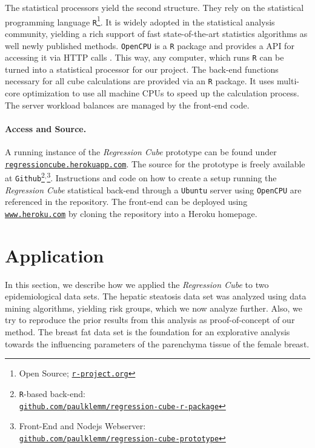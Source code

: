 \documentclass[journal]{style/vgtc} 			          %
\newcommand{\com}[1]{\textcolor{orange}{\uline{#1}}}
\begin{document}
The statistical processors yield the second structure.
They rely on the statistical programming language \texttt{R}\footnote{Open Source; \href{http://r-project.org}{\texttt{r-project.org}}}.
It is widely adopted in the statistical analysis community, yielding a rich support of fast state-of-the-art statistics algorithms as well newly published methods.
\texttt{OpenCPU} is a \texttt{R} package and provides a API for accessing it via HTTP calls \cite{Ooms}.
This way, any computer, which runs \texttt{R} can be turned into a statistical processor for our project.
The back-end functions necessary for all cube calculations are provided via an \texttt{R} package.
It uses multi-core optimization to use all machine CPUs to speed up the calculation process.
The server workload balances are managed by the front-end code.

\paragraph{Access and Source.}
A running instance of the \emph{Regression Cube} prototype can be found under \href{http://regressioncube.herokuapp.com/}{\texttt{regressioncube.herokuapp.com}}.
The source for the prototype is freely available at \texttt{Github}\footnote{\texttt{R}-based back-end: \href{https://github.com/paulklemm/regression-cube-r-package}{\\\texttt{github.com/paulklemm/regression-cube-r-package}}}$^{,}$\footnote{Front-End and Nodejs Webserver: \href{https://github.com/paulklemm/regression-cube-prototype}{\texttt{\\github.com/paulklemm/regression-cube-prototype}}}.
Instructions and code on how to create a setup running the \emph{Regression Cube} statistical back-end through a \texttt{Ubuntu} server using \texttt{OpenCPU} are referenced in the repository.
The front-end can be deployed using \href{https://www.heroku.com/}{\texttt{www.heroku.com}} by cloning the repository into a Heroku homepage. 

\section{Application} \label{application}
In this section, we describe how we applied the \emph{Regression Cube} to two epidemiological data sets.
The hepatic steatosis data set was analyzed using data mining algorithms, yielding risk groups, which we now analyze further.
Also, we try to reproduce the prior results from this analysis as proof-of-concept of our method.
The breast fat data set is the foundation for an explorative analysis towards the influencing parameters of the parenchyma tissue of the female breast.
\end{document}
